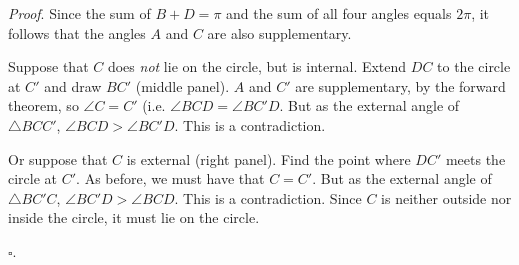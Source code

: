 \documentclass[11pt, oneside]{article}
\begin{document}
\emph{Proof}.
Since the sum of $B + D = \pi$ and the sum of all four angles equals $2 \pi$, it follows that the angles $A$ and $C$ are also supplementary.

Suppose that $C$ does \emph{not} lie on the circle, but is internal.  Extend $DC$ to the circle at $C'$ and draw $BC'$ (middle panel).  $A$ and $C'$ are supplementary, by the forward theorem, so $\angle C = C'$ (i.e. $\angle BCD = \angle BC'D$.  But as the external angle of $\triangle BCC'$, $\angle BCD > \angle BC'D$.  This is a contradiction.

Or suppose that $C$ is external (right panel).  Find the point where $DC'$ meets the circle at $C'$.  As before, we must have that $C = C'$.  But as the external angle of $\triangle BC'C$, $\angle BC'D > \angle BCD$.  This is a contradiction.  Since $C$ is neither outside nor inside the circle, it must lie on the circle.

$\square$.
\end{document}
